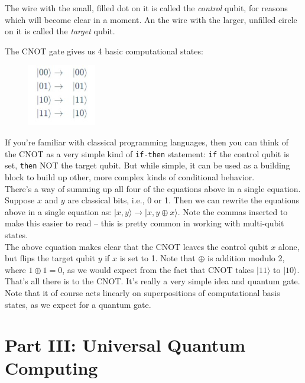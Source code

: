 \documentclass{article}
\newcommand{\code}[1]{\colorbox{light-gray}{\texttt{#1}}}
\begin{document}
The wire with the small, filled dot on it is called the \textit{control} qubit,
for reasons which will become clear in a moment. An the wire with the larger,
unfilled circle on it is called the \textit{target} qubit.

The CNOT gate gives us 4 basic computational states:

\begin{figure}[h]
    \includegraphics[width=3cm]{5.jpg}
    \centering
\end{figure}

If you're familiar with classical programming languages, then you can think of
the CNOT as a very simple kind of \code{if-then} statement: \code{if} the
control qubit is set, \code{then} NOT the target qubit. But while simple, it
can be used as a building block to build up other, more complex kinds of
conditional behavior.\\
There's a way of summing up all four of the equations above in a single
equation. Suppose $x$ and $y$ are classical bits, i.e., 0 or 1. Then we can
rewrite the equations above in a single equation as: $|x,y\rangle\rightarrow |x,y\oplus x\rangle$.
Note the commas inserted to make this easier to read -- this is pretty common
in working with multi-qubit states. \\
The above equation makes clear that the CNOT leaves the control qubit $x$ alone,
but flips the target qubit $y$ if $x$ is set to 1. Note that $\oplus$ is addition
modulo 2, where $1 \oplus 1 = 0$, as we would expect from the fact that CNOT
takes $|11\rangle$ to $|10\rangle$.\\
That's all there is to the CNOT. It's really a very simple idea and quantum
gate. Note that it of course acts linearly on superpositions of computational
basis states, as we expect for a quantum gate.

\section{Part III: Universal Quantum Computing}
\end{document}
